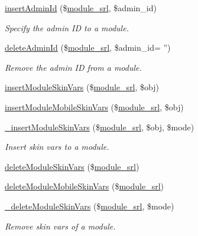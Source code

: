 \begin{DoxyCompactItemize}
\hyperlink{classmoduleController_af50247418fd7c87424958e95ea466b00}{insert\-Admin\-Id} (\$\hyperlink{ko_8install_8php_a370bb6450fab1da3e0ed9f484a38b761}{module\-\_\-srl}, \$admin\-\_\-id)
\begin{DoxyCompactList}\small\item\em Specify the admin I\-D to a module. \end{DoxyCompactList}\item 
\hyperlink{classmoduleController_a3ba07d8a726a5f1d869480fa61a60487}{delete\-Admin\-Id} (\$\hyperlink{ko_8install_8php_a370bb6450fab1da3e0ed9f484a38b761}{module\-\_\-srl}, \$admin\-\_\-id= '')
\begin{DoxyCompactList}\small\item\em Remove the admin I\-D from a module. \end{DoxyCompactList}\item 
\hyperlink{classmoduleController_ad044df4dde2053b5dcbaf5077822290c}{insert\-Module\-Skin\-Vars} (\$\hyperlink{ko_8install_8php_a370bb6450fab1da3e0ed9f484a38b761}{module\-\_\-srl}, \$obj)
\item 
\hyperlink{classmoduleController_a6c7aab59734028d1c980053a75437a45}{insert\-Module\-Mobile\-Skin\-Vars} (\$\hyperlink{ko_8install_8php_a370bb6450fab1da3e0ed9f484a38b761}{module\-\_\-srl}, \$obj)
\item 
\hyperlink{classmoduleController_aea2dfb4f6a1d31acdbebf131058494cd}{\-\_\-insert\-Module\-Skin\-Vars} (\$\hyperlink{ko_8install_8php_a370bb6450fab1da3e0ed9f484a38b761}{module\-\_\-srl}, \$obj, \$mode)
\begin{DoxyCompactList}\small\item\em Insert skin vars to a module. \end{DoxyCompactList}\item 
\hyperlink{classmoduleController_ad85915b5cf2a31804f673cfc3320ac75}{delete\-Module\-Skin\-Vars} (\$\hyperlink{ko_8install_8php_a370bb6450fab1da3e0ed9f484a38b761}{module\-\_\-srl})
\item 
\hyperlink{classmoduleController_a16feed706aef2613cc417c68cb06ba8a}{delete\-Module\-Mobile\-Skin\-Vars} (\$\hyperlink{ko_8install_8php_a370bb6450fab1da3e0ed9f484a38b761}{module\-\_\-srl})
\item 
\hyperlink{classmoduleController_a88baeaa3755f270af223e17e7a96d20a}{\-\_\-delete\-Module\-Skin\-Vars} (\$\hyperlink{ko_8install_8php_a370bb6450fab1da3e0ed9f484a38b761}{module\-\_\-srl}, \$mode)
\begin{DoxyCompactList}\small\item\em Remove skin vars of a module. \end{DoxyCompactList}\item 

\end{DoxyCompactItemize}
